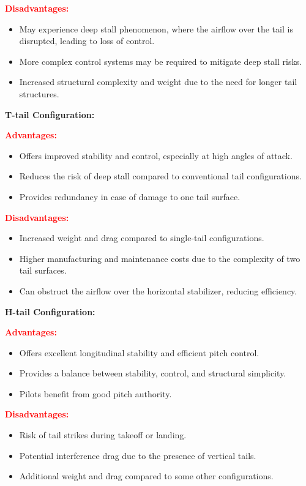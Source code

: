 \documentclass[12 pt]{article}
\begin{document}
{{\textbf{\textcolor{red}{Disadvantages:}}
\begin{itemize}
  \item May experience deep stall phenomenon, where the airflow over the tail is disrupted, leading to loss of control.
  \item More complex control systems may be required to mitigate deep stall risks.
  \item Increased structural complexity and weight due to the need for longer tail structures.
\end{itemize}
}

{\color{red}\textbf{T-tail Configuration:}}

{\color{black}
\textbf{\textcolor{red}{Advantages:}}
\begin{itemize}
  \item Offers improved stability and control, especially at high angles of attack.
  \item Reduces the risk of deep stall compared to conventional tail configurations.
  \item Provides redundancy in case of damage to one tail surface.
\end{itemize}

\textbf{\textcolor{red}{Disadvantages:}}
\begin{itemize}
  \item Increased weight and drag compared to single-tail configurations.
  \item Higher manufacturing and maintenance costs due to the complexity of two tail surfaces.
  \item Can obstruct the airflow over the horizontal stabilizer, reducing efficiency.
\end{itemize}
}

{\color{red}\textbf{H-tail Configuration:}}

{\color{black}
\textbf{\textcolor{red}{Advantages:}}
\begin{itemize}
  \item Offers excellent longitudinal stability and efficient pitch control.
  \item Provides a balance between stability, control, and structural simplicity.
  \item Pilots benefit from good pitch authority.
\end{itemize}

\textbf{\textcolor{red}{Disadvantages:}}
\begin{itemize}
  \item Risk of tail strikes during takeoff or landing.
  \item Potential interference drag due to the presence of vertical tails.
  \item Additional weight and drag compared to some other configurations.
\end{itemize}
}

}
\end{document}
